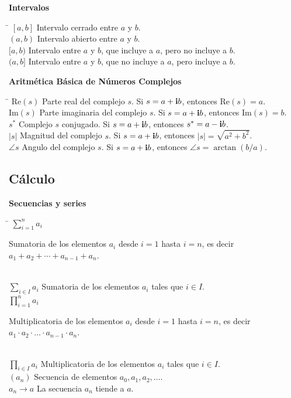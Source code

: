 \documentclass[11pt,letterpaper,twoside]{report}%
\begin{document}
{\bf Intervalos}
\begin{tabbing}
\hspace{\hdiml} \= \hspace{\hdim} \kill
$[a,b]$  \> Intervalo cerrado entre $a$ y $b$.\\[\lsk]
$(a,b)$  \> Intervalo abierto entre $a$ y $b$.\\[\lsk]
$[a,b)$ \> Intervalo entre $a$ y $b$, que incluye a $a$, pero no incluye a $b$.\\[\lsk]
$(a,b]$ \> Intervalo entre $a$ y $b$, que no incluye a $a$, pero incluye a $b$.\\[\lsk]
\end{tabbing}


{\bf Aritmética Básica de Números Complejos}
\begin{tabbing}
\hspace{\hdiml} \= \hspace{\hdim} \kill
$\mbox{Re}(s)$ \> Parte real del complejo $s$.  Si $s=a+\mathbf{i} b$, entonces $\mbox{Re}(s)=a$.\\[\lsk]
$\mbox{Im}(s)$ \> Parte imaginaria del complejo $s$.  Si $s=a+\mathbf{i} b$, entonces $\mbox{Im}(s)=b$.\\[\lsk]
$s^*$ \> Complejo $s$ conjugado.  Si $s=a+\mathbf{i} b$, entonces $s^*=a-\mathbf{i} b$.\\[\lsk]
$|s|$ \> Magnitud del complejo $s$.  Si $s=a+\mathbf{i} b$, entonces $|s|=\sqrt{a^2+b^2}$.\\[\lsk]
$\angle s$ \> Angulo del complejo $s$.  Si $s=a+\mathbf{i} b$, entonces $\angle s=\arctan(b/a)$.\\[\lsk]
\end{tabbing}


\subsection{Cálculo}

{\bf Secuencias y series}
\begin{tabbing}
\hspace{\hdiml} \= \hspace{\hdim} \kill
$\sum_{i=1}^n a_i$ \> \parbox[t]{\hdim}{Sumatoria de los elementos $a_i$ desde $i=1$ hasta $i=n$, es decir $a_1+a_2+\cdots+a_{n-1}+a_n$.}\\[\lsk]
$\sum_{i\in I} a_i$ \> Sumatoria de los elementos $a_i$ tales que $i\in I$.\\[\lsk]
$\prod_{i=1}^n a_i$ \> \parbox[t]{\hdim}{Multiplicatoria de los elementos $a_i$ desde $i=1$ hasta $i=n$, es decir $a_1\cdot a_2\cdot \ldots \cdot a_{n-1}\cdot a_n$.}\\[\lsk]
$\prod_{i\in I} a_i$ \> Multiplicatoria de los elementos $a_i$ tales que $i\in I$.\\[\lsk]
$(a_n)$ \> Secuencia de elementos $a_0, a_1, a_2, \ldots$.\\[\lsk]
$a_n\rightarrow a$ \> La secuencia $a_n$ tiende a $a$.\\[\lsk]
\end{tabbing}
\end{document}
